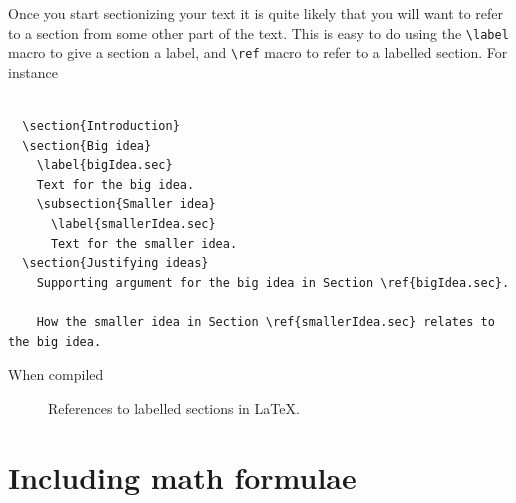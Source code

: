 Once you start sectionizing your text it is quite likely that you will want to refer to a section from some other part of the text. This is easy to do using the \verb|\label| macro to give a section a label, and \verb|\ref| macro to refer to a labelled section. For instance

\begin{verbatim}

  \section{Introduction}
  \section{Big idea}
    \label{bigIdea.sec}
    Text for the big idea.
    \subsection{Smaller idea}
      \label{smallerIdea.sec}
      Text for the smaller idea.
  \section{Justifying ideas}
    Supporting argument for the big idea in Section \ref{bigIdea.sec}. 
    
    How the smaller idea in Section \ref{smallerIdea.sec} relates to the big idea.

\end{verbatim}

When compiled 
\begin{figure}[htbp!]
    \centering
    \caption{References to labelled sections in \LaTeX{}.}
    \label{overleafLabelRef.fig}
\end{figure}


\section{Including math formulae}

